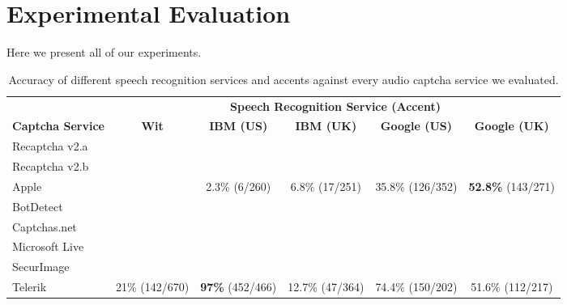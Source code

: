 \section{Experimental Evaluation}
\label{sec:evaluation}

Here we present all of our experiments.

\begin{table*}[t]
\centering
\caption{Accuracy of different speech recognition services and accents against every audio captcha service we evaluated.}
\begin{tabular}{lccccc}
\toprule
&\multicolumn{5}{c}{\textbf{Speech Recognition Service (Accent)}}\\
\cmidrule{2-6}
\textbf{Captcha Service}& \textbf{Wit}& \textbf{IBM (US)} & \textbf{ IBM (UK)} & \textbf{Google (US)} & \textbf{Google (UK)} \\
\hline
Recaptcha v2.a &  &  & & & \\
\rowcolor{Gray}
Recaptcha v2.b &  &  &  & & \\
Apple  &  & 2.3\% (6/260) & 6.8\% (17/251) & 35.8\% (126/352) & \textbf{52.8\%} (143/271) \\
\rowcolor{Gray}
BotDetect  &  & &  & & \\
Captchas.net  & &  &  & & \\
\rowcolor{Gray}
Microsoft Live & &  &  & & \\
SecurImage  &  & &  & & \\
\rowcolor{Gray}
Telerik  & 21\% (142/670)  & \textbf{97\%} (452/466) & 12.7\% (47/364) & 74.4\% (150/202) & 51.6\% (112/217) \\
\end{tabular}
\label{tab:combinations}
\end{table*}







